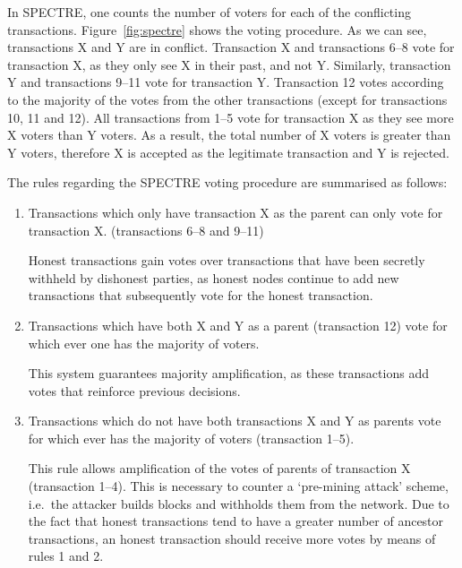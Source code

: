 \documentclass[a4paper,10pt,twocolumn]{article}
\begin{document}
	\vspace{-3.5mm}
	
	
	 In SPECTRE, one counts the number of voters for each of the conflicting transactions. Figure~\ref{fig:spectre} shows the voting 
	 procedure. As we can see, transactions X and Y are in conflict. Transaction X and transactions 6--8 vote for transaction X, as they 
	 only see X in their past, and not Y. Similarly, transaction Y and transactions 9--11 vote for transaction Y. Transaction 12 votes 
	 according to the majority of the votes from the other transactions (except for transactions 10, 11 and 12). All transactions from 1--5 
	 vote for transaction X as they see more X voters than Y voters. As a result, the total number of X voters is greater than Y voters, 
	 therefore X is accepted as the legitimate transaction and Y is rejected. 
	
	\vspace{2.5mm}
	
	 The rules regarding the SPECTRE voting procedure are summarised as follows:
	
	 \vspace{-0.5\baselineskip}
	 \begin{enumerate}
		 \setlength\itemsep{0em}
	\item Transactions which only have transaction X as the parent can only vote for transaction X. (transactions 6--8 and 9--11) 
	
	\vspace{1mm}
	Honest transactions gain votes over transactions that have been secretly withheld by dishonest parties, as honest nodes continue to add 
	new transactions that subsequently vote for the honest transaction.
	 \item Transactions which have both X and Y as a parent (transaction 12) vote for which ever one has the majority of voters. 
	
	\newpage
	
	This system guarantees majority amplification, as these transactions add votes that reinforce previous decisions. 
	 \item  Transactions which do not have both transactions X and Y as parents vote for which ever has the majority of voters (transaction 
	 1--5).
	
	\vspace{1mm}
	 This rule allows amplification of the votes of parents of transaction X (transaction 1--4). This is necessary to counter a `pre-mining 
	 attack' scheme, i.e.\ the attacker builds blocks and withholds them from the network. Due to the fact that honest transactions tend to 
	 have a greater number of ancestor transactions, an honest transaction should receive more votes by means of rules 1 and 2.
	 \end{enumerate}
	
\end{document}
